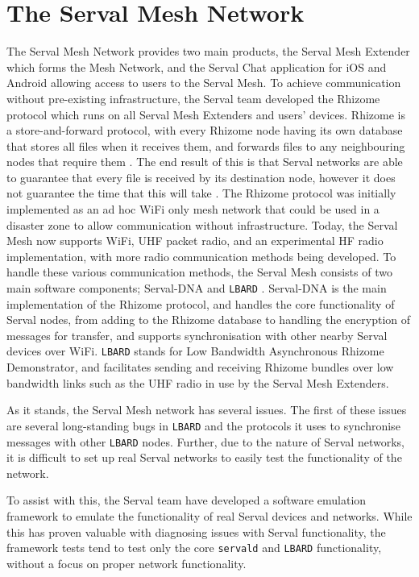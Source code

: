\section{The Serval Mesh Network}
The Serval Mesh Network provides two main products, the Serval Mesh Extender which forms the Mesh Network, and the Serval Chat application for iOS and Android allowing access to users to the Serval Mesh.
To achieve communication without pre-existing infrastructure, the Serval team developed the Rhizome protocol which runs on all Serval Mesh Extenders and users' devices.
Rhizome is a store-and-forward protocol, with every Rhizome node having its own database that stores all files when it receives them, and forwards files to any neighbouring nodes that require them \parencite{productizingServalMesh}.
The end result of this is that Serval networks are able to guarantee that every file is received by its destination node, however it does not guarantee the time that this will take \parencite{rhizomeDocumentation}.
The Rhizome protocol was initially implemented as an ad hoc WiFi only mesh network that could be used in a disaster zone to allow communication without infrastructure.
Today, the Serval Mesh now supports WiFi, UHF packet radio, and an experimental HF radio implementation, with more radio communication methods being developed.
To handle these various communication methods, the Serval Mesh consists of two main software components; Serval-DNA and \texttt{LBARD} \parencite{productizingServalMesh}.
Serval-DNA is the main implementation of the Rhizome protocol, and handles the core functionality of Serval nodes, from adding to the Rhizome database to handling the encryption of messages for transfer, and supports synchronisation with other nearby Serval devices over WiFi.
\texttt{LBARD} stands for Low Bandwidth Asynchronous Rhizome Demonstrator, and facilitates sending and receiving Rhizome bundles over low bandwidth links such as the UHF radio in use by the Serval Mesh Extenders.

As it stands, the Serval Mesh network has several issues.
The first of these issues are several long-standing bugs in \texttt{LBARD} and the protocols it uses to synchronise messages with other \texttt{LBARD} nodes.
Further, due to the nature of Serval networks, it is difficult to set up real Serval networks to easily test the functionality of the network.

To assist with this, the Serval team have developed a software emulation framework to emulate the functionality of real Serval devices and networks.
While this has proven valuable with diagnosing issues with Serval functionality, the framework tests tend to test only the core \texttt{servald} and \texttt{LBARD} functionality, without a focus on proper network functionality.

